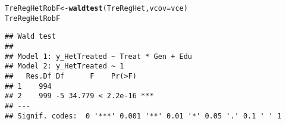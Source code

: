 \documentclass[11pt, a4paper]{article}\usepackage[]{graphicx}\usepackage[]{color}
\makeatletter
\newcommand{\hlstd}[1]{\textcolor[rgb]{0.345,0.345,0.345}{#1}}%
\newcommand{\hlkwb}[1]{\textcolor[rgb]{0.69,0.353,0.396}{#1}}%
\newcommand{\hlkwc}[1]{\textcolor[rgb]{0.333,0.667,0.333}{#1}}%
\newcommand{\hlkwd}[1]{\textcolor[rgb]{0.737,0.353,0.396}{\textbf{#1}}}%
\newenvironment{kframe}{%
 \def\at@end@of@kframe{}%
 \ifinner\ifhmode%
  \def\at@end@of@kframe{\end{minipage}}%
  \begin{minipage}{\columnwidth}%
 \fi\fi%
 \def\FrameCommand##1{\hskip\@totalleftmargin \hskip-\fboxsep
 \colorbox{shadecolor}{##1}\hskip-\fboxsep
     \hskip-\linewidth \hskip-\@totalleftmargin \hskip\columnwidth}%
 \MakeFramed {\advance\hsize-\width
   \@totalleftmargin\z@ \linewidth\hsize
   \@setminipage}}%
 {\par\unskip\endMakeFramed%
 \at@end@of@kframe}
\newenvironment{knitrout}{}{} %
\makeatother
\begin{document}
\begin{knitrout}
\begin{kframe}
\begin{alltt}
  \hlstd{TreRegHetRobF} \hlkwb{<-} \hlkwd{waldtest}\hlstd{(TreRegHet,} \hlkwc{vcov} \hlstd{= vce)}
  \hlstd{TreRegHetRobF}
\end{alltt}
\begin{verbatim}
## Wald test
## 
## Model 1: y_HetTreated ~ Treat * Gen + Edu
## Model 2: y_HetTreated ~ 1
##   Res.Df Df      F    Pr(>F)    
## 1    994                        
## 2    999 -5 34.779 < 2.2e-16 ***
## ---
## Signif. codes:  0 '***' 0.001 '**' 0.01 '*' 0.05 '.' 0.1 ' ' 1
\end{verbatim}
\end{kframe}
\end{knitrout}

\begin{kframe}


{\ttfamily\noindent\bfseries{}}\end{kframe}
\end{document}
